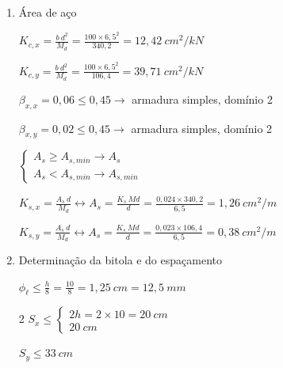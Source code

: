 \begin{resposta}
\begin{enumerate}[start=8]
\begin{enumerate}
            \item Área de aço
            
            $K_{c,x} = \frac{b \ d^2}{M_d} = \frac{100 \times 6,5^2}{340,2} = 12,42 \ cm^2/kN$
            
            $K_{c,y} = \frac{b \ d^2}{M_d} = \frac{100 \times 6,5^2}{106,4} = 39,71 \ cm^2/kN$ \newline

            $\beta_{x,x} = 0,06 \leq 0,45 \to$ armadura simples, domínio 2 \cite[tabela 1.1a]{tabelaskcks}

            $\beta_{x,y} = 0,02 \leq 0,45 \to$ armadura simples, domínio 2 \cite[tabela 1.1a]{tabelaskcks} \newline

            \begin{observacao}
                $\begin{cases}
                    A_s \geq A_{s,min} \to A_s \\
                    A_s < A_{s,min} \to A_{s,min}
                \end{cases}$
            \end{observacao}

            $K_{s,x} = \frac{A_s \ d}{M_d} \longleftrightarrow A_s = \frac{K_s \ Md}{d} = \frac{0,024 \times 340,2}{6,5} = 1,26 \ cm^2/m$

            $K_{s,y} = \frac{A_s \ d}{M_d} \longleftrightarrow A_s = \frac{K_s \ Md}{d} = \frac{0,023 \times 106,4}{6,5} = 0,38\ cm^2/m$ \newline

            \item Determinação da bitola e do espaçamento
            
            $\phi_\ell \leq \frac{h}{8} = \frac{10}{8} = 1,25 \ cm = 12,5 \ mm$ \cite[item 20.1]{nbr6118} \newline

            \cite[item 20.1]{nbr6118}

            \begin{multicols}{2}
                $S_x \leq \begin{cases}
                    2h = 2 \times 10 = 20 \ cm \\
                    20 \ cm
                \end{cases}$

                $S_y \leq 33 \ cm$
            \end{multicols}


\end{enumerate}
\end{enumerate}
\end{resposta}
